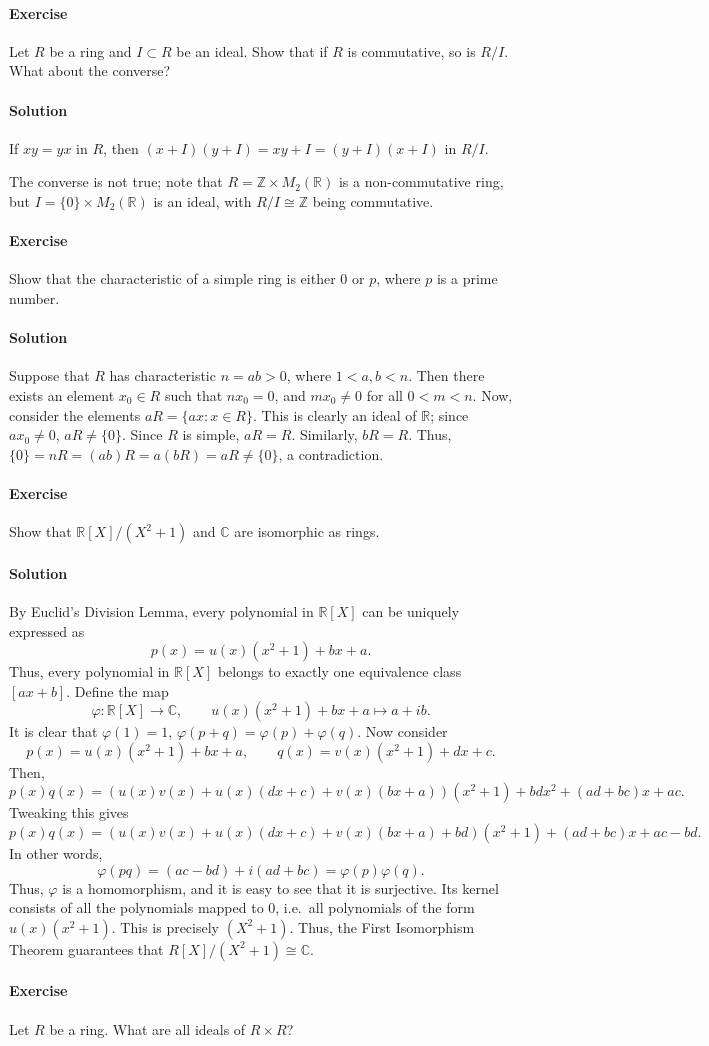\documentclass[10pt]{article}
\newcounter{prob}
\newcommand{\problem}{\stepcounter{prob}\paragraph{Exercise \arabic{prob}}}
\newcommand{\solution}{\paragraph{Solution}}
\newcommand{\C}{\mathbb{C}}
\newcommand{\R}{\mathbb{R}}
\newcommand{\Z}{\mathbb{Z}}
\begin{document}
    \problem Let $R$ be a ring and $I \subset R$ be an ideal. Show that if $R$ is
    commutative, so is $R/I$. What about the converse?

    \solution If $xy = yx$ in $R$, then $(x + I)(y + I) = xy + I = (y + I)(x + I)$ in
    $R/I$.

    The converse is not true; note that $R = \Z \times M_2(\R)$ is a non-commutative
    ring, but $I = \{0\} \times M_2(\R)$ is an ideal, with $R/I \cong \Z$ being
    commutative.


    \problem Show that the characteristic of a simple ring is either $0$ or $p$,
    where $p$ is a prime number.

    \solution Suppose that $R$ has characteristic $n = ab > 0$, where $1 < a, b < n$.
    Then there exists an element $x_0 \in R$ such that $nx_0 = 0$, and $mx_0 \neq 0$ for
    all $0 < m < n$. Now, consider the elements $aR = \{ax : x \in R\}$. This is
    clearly an ideal of $\R$; since $ax_0 \neq 0$, $aR \neq \{0\}$. Since $R$ is
    simple, $aR = R$. Similarly, $bR = R$. Thus, $\{0\} = nR = (ab)R = a(bR) = aR
    \neq \{0\}$, a contradiction.


    \problem Show that $\R[X]/(X^2 + 1)$ and $\C$ are isomorphic as rings.

    \solution By Euclid's Division Lemma, every polynomial in $\R[X]$ can be uniquely
    expressed as \[
        p(x) = u(x)(x^2 + 1) + bx + a.
    \] Thus, every polynomial in $\R[X]$ belongs to exactly one equivalence class
    $[ax + b]$. Define the map \[
        \varphi\colon \R[X] \to \C, \qquad u(x)(x^2 + 1) + bx + a \mapsto a + ib.
    \] It is clear that $\varphi(1) = 1$, $\varphi(p + q) = \varphi(p) + \varphi(q)$.
    Now consider \[
        p(x) = u(x)(x^2 + 1) + bx + a, \qquad
        q(x) = v(x)(x^2 + 1) + dx + c.
    \] Then, \[
        p(x)q(x) = (u(x)v(x) + u(x)(dx + c) + v(x)(bx + a))(x^2 + 1) + bdx^2 + (ad +
        bc)x + ac.
    \] Tweaking this gives \[
        p(x)q(x) = (u(x)v(x) + u(x)(dx + c) + v(x)(bx + a) + bd)(x^2 + 1) + (ad +
        bc)x + ac - bd.
    \] In other words, \[
        \varphi(pq) = (ac - bd) + i(ad + bc) = \varphi(p)\varphi(q).
    \] Thus, $\varphi$ is a homomorphism, and it is easy to see that it is
    surjective. Its kernel consists of all the polynomials mapped to $0$, i.e.\ all
    polynomials of the form $u(x)(x^2 + 1)$. This is precisely $(X^2 + 1)$. Thus, the
    First Isomorphism Theorem guarantees that $R[X]/(X^2 + 1) \cong \C$.


    \problem Let $R$ be a ring. What are all ideals of $R \times R$?
\end{document}
